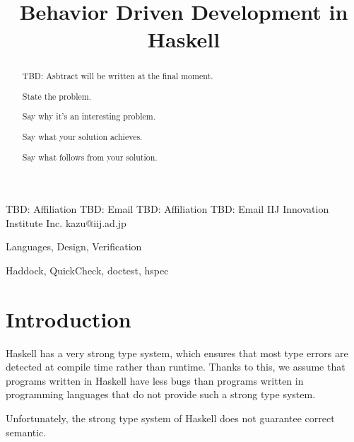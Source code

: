 \documentclass[preprint]{sigplanconf}
\begin{document}
\copyrightdata{[to be supplied]}


\title{Behavior Driven Development in Haskell}

           {TBD: Affiliation}
           {TBD: Email}
           {TBD: Affiliation}
           {TBD: Email}
           {IIJ Innovation Institute Inc.}
           {kazu@iij.ad.jp}

\maketitle

\begin{abstract}

TBD: Asbtract will be written at the final moment.

State the problem.

Say why it’s an interesting problem.

Say what your solution achieves.

Say what follows from your solution.

\end{abstract}


\terms Languages, Design, Verification

\keywords Haddock, QuickCheck, doctest, hspec

\section{Introduction}


Haskell has a very strong type system, which ensures that most type errors are
detected at compile time rather than runtime.  Thanks to this, we assume that
programs written in Haskell have less bugs than programs written in programming
languages that do not provide such a strong type system.

Unfortunately, the strong type system of Haskell does not guarantee correct
semantic.
\end{document}
